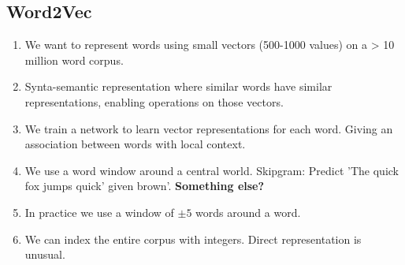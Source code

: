 \documentclass{article}
\begin{document}
	\subsection{Word2Vec}
	\begin{enumerate}
		\item We want to represent words using small vectors (500-1000 values) on a > 10 million word corpus.
		\item Synta-semantic representation where similar words have similar representations, enabling operations on those vectors.
		\item We train a network to learn vector representations for each word.
		\subitem Giving an association between words with local context.
		\item We use a word window around a central world.
		\subitem Skipgram: Predict 'The quick fox jumps quick' given brown'.
		\subitem \textbf{Something else?}
		\item In practice we use a window of $\pm 5$ words around a word.
		\item We can index the entire corpus with integers. Direct representation is unusual.
	\end{enumerate}
	\pagebreak
	
	
\end{document}
